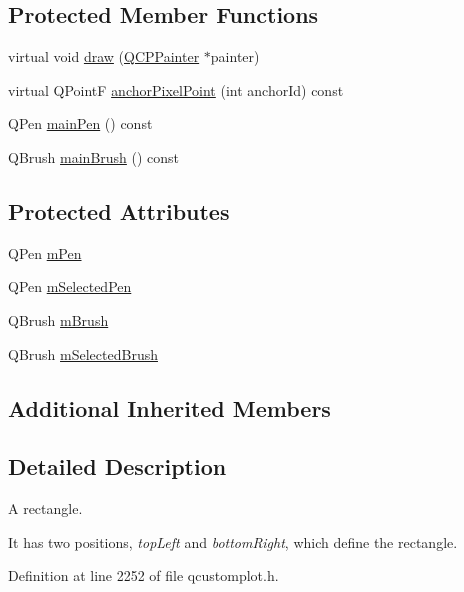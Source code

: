 \subsection*{Protected Member Functions}
\begin{DoxyCompactItemize}
\item 
virtual void \hyperlink{class_q_c_p_item_rect_a18cd583638b876cdd50f1a155ec182aa}{draw} (\hyperlink{class_q_c_p_painter}{Q\-C\-P\-Painter} $\ast$painter)
\item 
virtual Q\-Point\-F \hyperlink{class_q_c_p_item_rect_ae0973f8281fb52361b0c99ee899be07e}{anchor\-Pixel\-Point} (int anchor\-Id) const 
\item 
Q\-Pen \hyperlink{class_q_c_p_item_rect_afa0fb7c6328a1e197ecd537de36daf8f}{main\-Pen} () const 
\item 
Q\-Brush \hyperlink{class_q_c_p_item_rect_ab0bd8e272e822ec851ba5b0c20e9200e}{main\-Brush} () const 
\end{DoxyCompactItemize}
\subsection*{Protected Attributes}
\begin{DoxyCompactItemize}
\item 
Q\-Pen \hyperlink{class_q_c_p_item_rect_aa0d49323628d6752026056bfb52afd86}{m\-Pen}
\item 
Q\-Pen \hyperlink{class_q_c_p_item_rect_a73cc0bee61de3c67221ec8c7a76a29ed}{m\-Selected\-Pen}
\item 
Q\-Brush \hyperlink{class_q_c_p_item_rect_a2d7f207fada27588b3a52b19234d3c2e}{m\-Brush}
\item 
Q\-Brush \hyperlink{class_q_c_p_item_rect_a21b70eee59b6e19ae0bbdf037b13508f}{m\-Selected\-Brush}
\end{DoxyCompactItemize}
\subsection*{Additional Inherited Members}


\subsection{Detailed Description}
A rectangle. 

 It has two positions, {\itshape top\-Left} and {\itshape bottom\-Right}, which define the rectangle. 

Definition at line 2252 of file qcustomplot.\-h.



